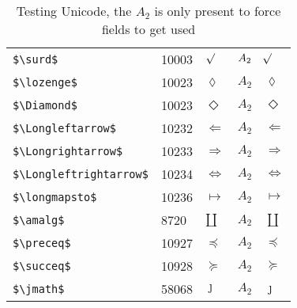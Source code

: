 \documentclass{article}
\begin{document}
\begin{table}
\begin{center}
\begin{tabular}{llll}
 \verb#$\surd$#               & 10003   & $\surd$               & $A_2\quad \surd$\\
 \verb#$\lozenge$#            & 10023   & $\lozenge$            & $A_2\quad \lozenge$\\
 \verb#$\Diamond$#            & 10023   & $\Diamond$            & $A_2\quad \Diamond$\\
 \verb#$\Longleftarrow$#      & 10232   & $\Longleftarrow$      & $A_2\quad \Longleftarrow$\\
 \verb#$\Longrightarrow$#     & 10233   & $\Longrightarrow$     & $A_2\quad \Longrightarrow$\\
 \verb#$\Longleftrightarrow$# & 10234   & $\Longleftrightarrow$ & $A_2\quad \Longleftrightarrow$\\
 \verb#$\longmapsto$#         & 10236   & $\longmapsto$         & $A_2\quad \longmapsto$\\
 \verb#$\amalg$#              & 8720    & $\amalg$              & $A_2\quad \amalg$\\
 \verb#$\preceq$#             & 10927   & $\preceq$             & $A_2\quad \preceq$\\
 \verb#$\succeq$#             & 10928   & $\succeq$             & $A_2\quad \succeq$\\
 \verb#$\jmath$#              & 58068   & $\jmath$              & $A_2\quad \jmath$\\
\end{tabular}
\end{center}
\caption{Testing Unicode, the $A_2$ is only present to force fields to get used}
\end{table}
\end{document}
